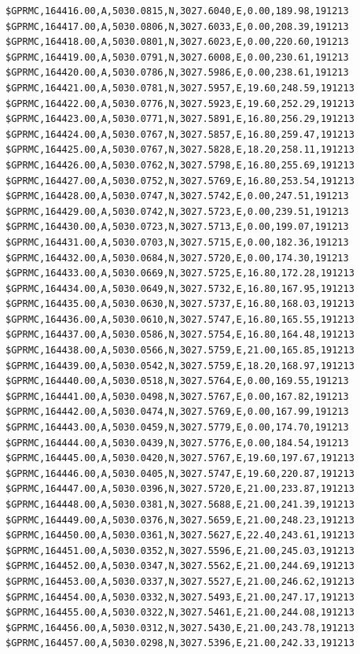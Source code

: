 \documentclass[simple,a4paper,14pt,ukrainian,utf8]{eskdtext}
\begin{document}
\begin{appendices}
\begin{small}
\begin{lstlisting}
$GPRMC,164416.00,A,5030.0815,N,3027.6040,E,0.00,189.98,191213
$GPRMC,164417.00,A,5030.0806,N,3027.6033,E,0.00,208.39,191213
$GPRMC,164418.00,A,5030.0801,N,3027.6023,E,0.00,220.60,191213
$GPRMC,164419.00,A,5030.0791,N,3027.6008,E,0.00,230.61,191213
$GPRMC,164420.00,A,5030.0786,N,3027.5986,E,0.00,238.61,191213
$GPRMC,164421.00,A,5030.0781,N,3027.5957,E,19.60,248.59,191213
$GPRMC,164422.00,A,5030.0776,N,3027.5923,E,19.60,252.29,191213
$GPRMC,164423.00,A,5030.0771,N,3027.5891,E,16.80,256.29,191213
$GPRMC,164424.00,A,5030.0767,N,3027.5857,E,16.80,259.47,191213
$GPRMC,164425.00,A,5030.0767,N,3027.5828,E,18.20,258.11,191213
$GPRMC,164426.00,A,5030.0762,N,3027.5798,E,16.80,255.69,191213
$GPRMC,164427.00,A,5030.0752,N,3027.5769,E,16.80,253.54,191213
$GPRMC,164428.00,A,5030.0747,N,3027.5742,E,0.00,247.51,191213
$GPRMC,164429.00,A,5030.0742,N,3027.5723,E,0.00,239.51,191213
$GPRMC,164430.00,A,5030.0723,N,3027.5713,E,0.00,199.07,191213
$GPRMC,164431.00,A,5030.0703,N,3027.5715,E,0.00,182.36,191213
$GPRMC,164432.00,A,5030.0684,N,3027.5720,E,0.00,174.30,191213
$GPRMC,164433.00,A,5030.0669,N,3027.5725,E,16.80,172.28,191213
$GPRMC,164434.00,A,5030.0649,N,3027.5732,E,16.80,167.95,191213
$GPRMC,164435.00,A,5030.0630,N,3027.5737,E,16.80,168.03,191213
$GPRMC,164436.00,A,5030.0610,N,3027.5747,E,16.80,165.55,191213
$GPRMC,164437.00,A,5030.0586,N,3027.5754,E,16.80,164.48,191213
$GPRMC,164438.00,A,5030.0566,N,3027.5759,E,21.00,165.85,191213
$GPRMC,164439.00,A,5030.0542,N,3027.5759,E,18.20,168.97,191213
$GPRMC,164440.00,A,5030.0518,N,3027.5764,E,0.00,169.55,191213
$GPRMC,164441.00,A,5030.0498,N,3027.5767,E,0.00,167.82,191213
$GPRMC,164442.00,A,5030.0474,N,3027.5769,E,0.00,167.99,191213
$GPRMC,164443.00,A,5030.0459,N,3027.5779,E,0.00,174.70,191213
$GPRMC,164444.00,A,5030.0439,N,3027.5776,E,0.00,184.54,191213
$GPRMC,164445.00,A,5030.0420,N,3027.5767,E,19.60,197.67,191213
$GPRMC,164446.00,A,5030.0405,N,3027.5747,E,19.60,220.87,191213
$GPRMC,164447.00,A,5030.0396,N,3027.5720,E,21.00,233.87,191213
$GPRMC,164448.00,A,5030.0381,N,3027.5688,E,21.00,241.39,191213
$GPRMC,164449.00,A,5030.0376,N,3027.5659,E,21.00,248.23,191213
$GPRMC,164450.00,A,5030.0361,N,3027.5627,E,22.40,243.61,191213
$GPRMC,164451.00,A,5030.0352,N,3027.5596,E,21.00,245.03,191213
$GPRMC,164452.00,A,5030.0347,N,3027.5562,E,21.00,244.69,191213
$GPRMC,164453.00,A,5030.0337,N,3027.5527,E,21.00,246.62,191213
$GPRMC,164454.00,A,5030.0332,N,3027.5493,E,21.00,247.17,191213
$GPRMC,164455.00,A,5030.0322,N,3027.5461,E,21.00,244.08,191213
$GPRMC,164456.00,A,5030.0312,N,3027.5430,E,21.00,243.78,191213
$GPRMC,164457.00,A,5030.0298,N,3027.5396,E,21.00,242.33,191213

\end{lstlisting}
\end{small}
\end{appendices}
\end{document}
